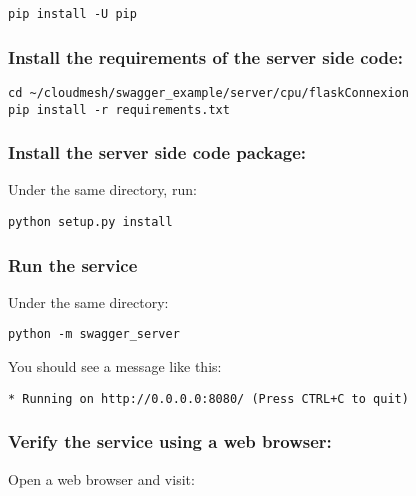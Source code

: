 \begin{verbatim}
pip install -U pip
\end{verbatim}

\hypertarget{install-the-requirements-of-the-server-side-code}{%
\subsubsection{Install the requirements of the server side
code:}\label{install-the-requirements-of-the-server-side-code}}

\begin{verbatim}
cd ~/cloudmesh/swagger_example/server/cpu/flaskConnexion
pip install -r requirements.txt
\end{verbatim}

\hypertarget{install-the-server-side-code-package}{%
\subsubsection{Install the server side code
package:}\label{install-the-server-side-code-package}}

Under the same directory, run:

\begin{verbatim}
python setup.py install
\end{verbatim}

\hypertarget{run-the-service}{%
\subsubsection{Run the service}\label{run-the-service}}

Under the same directory:

\begin{verbatim}
python -m swagger_server
\end{verbatim}

You should see a message like this:

\begin{verbatim}
* Running on http://0.0.0.0:8080/ (Press CTRL+C to quit)
\end{verbatim}

\hypertarget{verify-the-service-using-a-web-browser}{%
\subsubsection{Verify the service using a web
browser:}\label{verify-the-service-using-a-web-browser}}

Open a web browser and visit:

